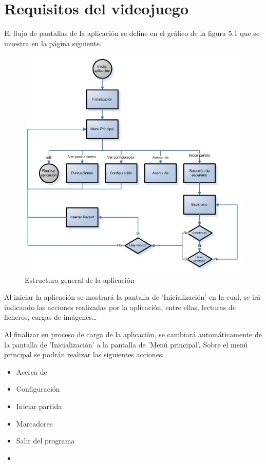 \section{Requisitos del videojuego}
\begin{description}
 {El flujo de pantallas de la aplicación se define en el gráfico de la figura 5.1 que se muestra en la página siguiente.

	\begin{figure}[p]
	\centering	
         \includegraphics[width=15cm]{img/EstructuraGeneralPacmania.jpg}
	\caption{Estructura general de la aplicación}
	\end{figure}
}

 {Al iniciar la aplicación se mostrará la pantalla de 'Inicialización' en la cual, se irá indicando las acciones realizadas por la aplicación, entre ellas, lecturas de ficheros, cargas de imágenes\ldots
}

 {Al finalizar en proceso de carga de la aplicación, se cambiará automáticamente de la pantalla de 'Inicialización' a la pantalla de 'Menú principal'. Sobre el menú principal se podrán realizar las siguientes acciones:
\begin{multicols}{2}
\begin{itemize}
\item Acerca de                  
\item Configuración             
\item Iniciar partida         
\end{itemize}
\begin{itemize}
\item Marcadores               
\item Salir del programa
\item []
\end{itemize}
\end{multicols}

}
\end{description}

